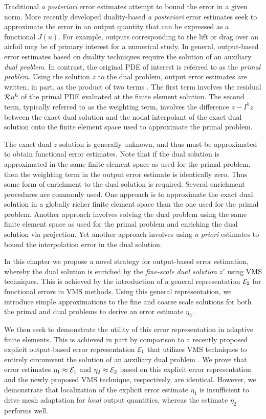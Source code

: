 Traditional \emph{a posteriori} error estimates attempt
to bound the error in a given norm.
More recently developed duality-based \emph{a posteriori} error
estimates \cite{fidkowski2011review} seek to approximate
the error in an output quantity that can be expressed
as a functional $J(u)$. For example, outputs corresponding to
the lift or drag over an airfoil may be of primary
interest for a numerical study. In general, output-based
error estimates based on duality techniques require the
solution of an auxiliary \emph{dual problem}. In contrast,
the original PDE of interest is referred to as the
\emph{primal problem}. Using the solution $z$
to the dual problem, output error estimates are
written, in part, as the product
of two terms \cite{becker2001optimal, bangerth2013adaptive}.
The first term involves the residual $\mathcal{R} u^h$ of the
primal PDE evaluated at the finite element solution.
The second term, typically referred to as the
weighting term, involves the difference $z - I^h z$
between the exact dual solution and the nodal interpolant
of the exact dual solution onto the finite element space
used to approximate the primal problem.

The exact dual $z$ solution is generally unknown,
and thus must be approximated to obtain functional
error estimates. Note that if the dual solution is
approximated in the same finite element space as used
for the primal problem, then the weighting term in the
output error estimate is identically zero.
Thus some form of enrichment to the dual solution
is required. Several enrichment procedures are commonly
used. One approach is to approximate the exact dual
solution in a globally richer finite element space than
the one used for the primal problem. Another approach
involves solving the dual problem using the same finite
element space as used for the primal problem and enriching
the dual solution via projection. Yet another approach
involves using \emph{a priori} estimates to bound the
interpolation error in the dual solution.

In this chapter we propose a novel strategy for output-based
error estimation, whereby the dual solution is enriched
by the \emph{fine-scale dual solution} $z'$ using VMS
techniques.
This is achieved by the introduction of a general
representation $\mathcal{E}_2$ for functional errors
in VMS methods. Using this general representation,
we introduce simple approximations to the fine and coarse
scale solutions for both the primal and dual problems to
derive an error estimate $\eta_2$.

We then seek to demonstrate the utility of this error
representation in adaptive finite elements.
This is achieved in part by comparison to a
recently proposed explicit output-based error representation
$\mathcal{E}_1$ that utilizes VMS techniques to
entirely circumvent the solution of an auxiliary dual problem
\cite{hauke2009variational}.
We prove that error estimates $\eta_1 \approx \mathcal{E}_1$
and $\eta_2 \approx \mathcal{E}_2$ based on this explicit error
representation and the newly proposed VMS technique, respectively,
are identical. However, we demonstrate that localization
of the explicit error estimate $\eta_1$ is
insufficient to drive mesh adaptation for \emph{local}
output quantities, whereas the estimate $\eta_2$
performs well.

